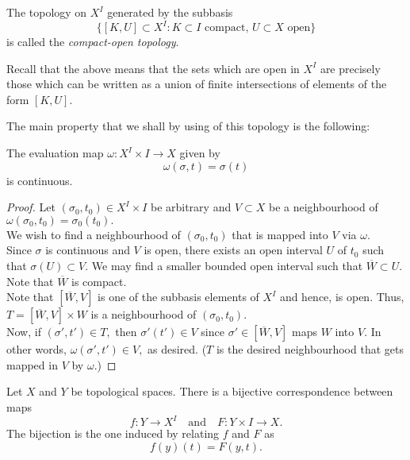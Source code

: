 \documentclass[12pt]{article}
\begin{document}
\begin{defn}
	The topology on $X^I$ generated by the subbasis
	\begin{equation*} 
		\{[K, U]\subset X^I : K \subset I \text{ compact, } U \subset X \text{ open}\}
	\end{equation*}
	is called the \emph{compact-open topology}.
\end{defn}

Recall that the above means that the sets which are open in $X^I$ are precisely those which can be written as a union of finite intersections of elements of the form $[K, U].$ 

The main property that we shall by using of this topology is the following:

\begin{prop} \label{prop:evaluationcontinuous}
	The evaluation map $\omega:X^I \times I \to X$ given by
	\begin{equation*} 
		\omega(\sigma, t) = \sigma(t)
	\end{equation*}
	is continuous.
\end{prop}

\begin{proof} 
	Let $(\sigma_0, t_0) \in X^I\times I$ be arbitrary and $V \subset X$ be a neighbourhood of $\omega(\sigma_0, t_0) = \sigma_0(t_0).$\\
	We wish to find a neighbourhood of $(\sigma_0, t_0)$ that is mapped into $V$ via $\omega.$\\
	Since $\sigma$ is continuous and $V$ is open, there exists an open interval $U$ of $t_0$ such that $\sigma(U) \subset V.$ We may find a smaller bounded open interval such that $\overline{W} \subset U.$ Note that $\overline{W}$ is compact. \\
	Note that $[\overline{W}, V]$ is one of the subbasis elements of $X^I$ and hence, is open. Thus, $T = [\overline{W}, V]\times W$ is a neighbourhood of $(\sigma_0, t_0).$\\
	Now, if $(\sigma', t') \in T,$ then $\sigma'(t') \in V$ since $\sigma' \in [\overline{W}, V]$ maps $W$ into $V.$ In other words, $\omega(\sigma', t') \in V,$ as desired. ($T$ is the desired neighbourhood that gets mapped in $V$ by $\omega.$)
\end{proof}

\begin{prop}\label{prop:bijectivecorresp}
	Let $X$ and $Y$ be topological spaces. There is a bijective correspondence between maps
	\begin{equation*} 
		f:Y\to X^I \quad \text{and} \quad F:Y\times I \to X.
	\end{equation*}
	The bijection is the one induced by relating $f$ and $F$ as
	\begin{equation*} 
		f(y)(t) = F(y, t).
	\end{equation*}
\end{prop}
\end{document}
